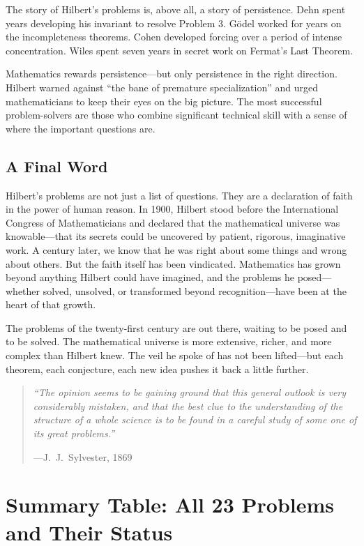 The story of Hilbert's problems is, above all, a story of persistence. Dehn spent years developing his invariant to resolve Problem 3. G\"odel worked for years on the incompleteness theorems. Cohen developed forcing over a period of intense concentration. Wiles spent seven years in secret work on Fermat's Last Theorem.

Mathematics rewards persistence---but only persistence in the right direction. Hilbert warned against ``the bane of premature specialization'' and urged mathematicians to keep their eyes on the big picture. The most successful problem-solvers are those who combine significant technical skill with a sense of where the important questions are.

\subsection{A Final Word}

Hilbert's problems are not just a list of questions. They are a declaration of faith in the power of human reason. In 1900, Hilbert stood before the International Congress of Mathematicians and declared that the mathematical universe was knowable---that its secrets could be uncovered by patient, rigorous, imaginative work. A century later, we know that he was right about some things and wrong about others. But the faith itself has been vindicated. Mathematics has grown beyond anything Hilbert could have imagined, and the problems he posed---whether solved, unsolved, or transformed beyond recognition---have been at the heart of that growth.

The problems of the twenty-first century are out there, waiting to be posed and to be solved. The mathematical universe is more extensive, richer, and more complex than Hilbert knew. The veil he spoke of has not been lifted---but each theorem, each conjecture, each new idea pushes it back a little further.

\begin{quote}
\textit{``The opinion seems to be gaining ground that this general outlook is very considerably mistaken, and that the best clue to the understanding of the structure of a whole science is to be found in a careful study of some one of its great problems.''}
\par\hfill ---J.\ J.\ Sylvester, 1869
\end{quote}

\section*{Summary Table: All 23 Problems and Their Status}

